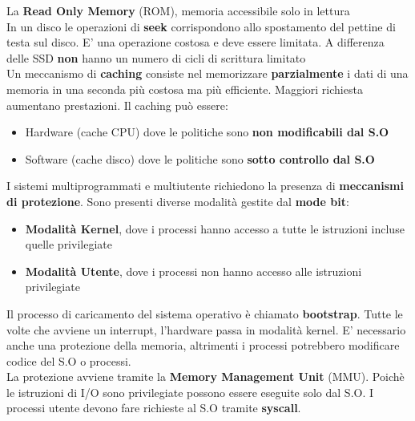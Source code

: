 \documentclass{article}
\begin{document}
La \textbf{Read Only Memory} (ROM), memoria accessibile solo in lettura\\
In un disco le operazioni di \textbf{seek} corrispondono allo spostamento del pettine di testa sul disco. E' una operazione costosa e deve essere limitata. A differenza delle SSD \textbf{non} hanno un numero di cicli di scrittura limitato\\
Un meccanismo di \textbf{caching} consiste nel memorizzare \textbf{parzialmente} i dati di una memoria in una seconda più costosa ma più efficiente. Maggiori richiesta aumentano prestazioni. Il caching può essere:
\begin{itemize}
  \item Hardware (cache CPU) dove le politiche sono \textbf{non modificabili dal S.O}
  \item Software (cache disco) dove le politiche sono \textbf{sotto controllo dal S.O}
\end{itemize}

I sistemi multiprogrammati e multiutente richiedono la presenza di \textbf{meccanismi di protezione}. Sono presenti diverse modalità gestite dal \textbf{mode bit}:
\begin{itemize}
  \item \textbf{Modalità Kernel}, dove i processi hanno accesso a tutte le istruzioni incluse quelle privilegiate
  \item \textbf{Modalità Utente}, dove i processi non hanno accesso alle istruzioni privilegiate
\end{itemize}
Il processo di caricamento del sistema operativo è chiamato \textbf{bootstrap}. Tutte le volte che avviene un interrupt, l'hardware passa in modalità kernel. E' necessario anche una protezione della memoria, altrimenti i processi potrebbero modificare codice del S.O o processi.\\
La protezione avviene tramite la \textbf{Memory Management Unit} (MMU). Poichè le istruzioni di I/O sono privilegiate possono essere eseguite solo dal S.O. I processi utente devono fare richieste al S.O tramite \textbf{syscall}.
\end{document}
